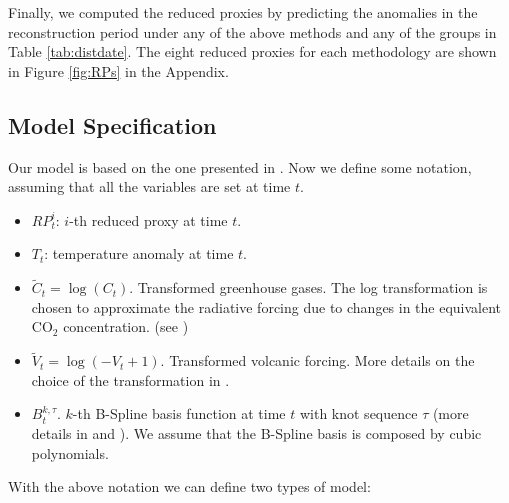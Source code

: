 \documentclass[11pt]{amsart}
\theoremstyle{plain}
\theoremstyle{definition}
\theoremstyle{remark}
\begin{document}
Finally, we computed the reduced proxies by predicting the anomalies in the
reconstruction period under any of the above methods and any of the groups in
Table \ref{tab:distdate}. The eight reduced proxies for each methodology are
shown in Figure \ref{fig:RPs} in the Appendix.

\subsection{Model Specification}
\label{sec:model}

Our model is based on the one presented in \cite{Barboza2014}. Now we define
some notation, assuming that all the variables are set at time $t$.
\begin{itemize}
\item $RP_t^i$: $i$-th reduced proxy at time $t$.
  
\item $T_t$: temperature anomaly at time $t$.
  
\item $\tilde C_t = \log (C_t)$. Transformed greenhouse gases. The log
  transformation is chosen to approximate the radiative forcing due to changes
  in the equivalent CO$_2$ concentration. (see \cite{Barboza2014})
  
\item $\tilde V_t = \log (-V_t+1)$. Transformed volcanic forcing. More details
  on the choice of the transformation in \cite{Barboza2014}.
  
\item $B_t^{k,\tau}$. $k$-th B-Spline basis function at time $t$ with knot
  sequence $\tau$ (more details in \cite{DeBoor2001} and \cite{Ramsay2005}). We assume that the
  B-Spline basis is composed by cubic polynomials.  
\end{itemize}
With the above notation we can define two types of model:
\end{document}
